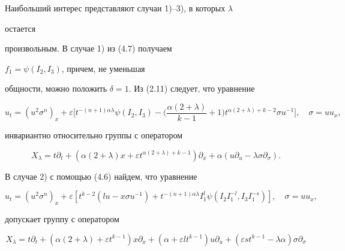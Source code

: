 Наибольший интерес представляют случаи 1)--3), в которых $\lambda$


остается


произвольным. В случае 1) из (4.7) получаем


$f_1=\psi(I_2,I_3)$, причем, не уменьшая


общности, можно положить $\delta=1$. Из (2.11) следует, что уравнение


\begin{equation}


u_t=(u^2\sigma^n)_x+\varepsilon\biggl[t^{-(n+1)\alpha\lambda}


\psi(I_2,I_3)-\biggl(\frac{\alpha(2+\lambda)}{k-1}+1\biggr)


t^{\alpha(2+\lambda)+k-2}\sigma u^{-1}\biggr],\quad \sigma=uu_x,


\tag{4.11}


\end{equation}


инвариантно относительно группы с оператором


\begin{equation}


X_\lambda=t\partial_t+(\alpha(2+\lambda)x+\varepsilon


t^{\alpha(2+\lambda)+k-1})\partial_x+


\alpha(u\partial_u-\lambda\sigma\partial_\sigma).\tag{4.12}


\end{equation}





В случае 2) с помощью (4.6) найдем, что уравнение


\begin{equation}


u_t=(u^2\sigma^n)_x+\varepsilon[t^{k-2}(lu-x\sigma u^{-1})+


t^{-(n+1)\alpha\lambda}I^l_1\psi(I_2I^{-l}_1,I_3I^{-s}_1)],\quad


\sigma=uu_x,\tag{4.13}


\end{equation}


допускает группу с оператором


\begin{equation}


X_\lambda=t\partial_t+(\alpha(2+\lambda)+\varepsilon t^{k-1})


x\partial_x+(\alpha+\varepsilon lt^{k-1})u\partial_u+


(\varepsilon st^{k-1}-\lambda\alpha)\sigma\partial_\sigma


\tag{4.14}


\end{equation}


